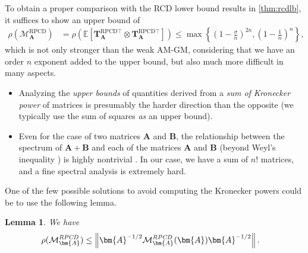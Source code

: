 \documentclass{article}
\theoremstyle{plain}
\newtheorem{lemma}[theorem]{Lemma}
\theoremstyle{definition}
\theoremstyle{remark}
\def\bignorm#1{\left\lVert#1\right\rVert}
\def\bigopen#1{\left(#1\right)}
\def\bigset#1{\left\{#1\right\}}
\newcommand{\RPCD}{\text{RPCD}} %
\newcommand{\MARPCD}{\mathcal{M}_{\bm{A}}^{\RPCD}} %
\def\mA{{\bm{A}}}
\def\mB{{\bm{B}}}
\def\mT{{\bm{T}}}
\def\gM{{\mathcal{M}}}
\newcommand{\E}{\mathbb{E}}
\begin{document}
To obtain a proper comparison with the RCD lower bound results in \cref{thm:rcdlb}, it suffices to show an upper bound of
\begin{align*}
    \rho(\MARPCD) &= \rho (\E [\mT_{\mA}^{\text{RPCD} \top} \otimes \mT_{\mA}^{\text{RPCD} \top}]) \le \max \bigset{\bigopen{1 - \frac{\sigma}{n}}^{2n}, \bigopen{1 - \frac{1}{n}}^{n}},
\end{align*}
which is not only stronger than the weak AM-GM, considering that we have an order $n$ exponent added to the upper bound, but also much more difficult in many aspects.
\begin{itemize}
    \item Analyzing the \emph{upper bounds} of quantities derived from a \emph{sum of Kronecker power} of matrices is presumably the harder direction than the opposite (we typically use the sum of squares \emph{as} an upper bound).
    \item Even for the case of two matrices $\mA$ and $\mB$, the relationship between the spectrum of $\mA + \mB$ and each of the matrices $\mA$ and $\mB$ (beyond Weyl's inequality \citep{weyl12}) is highly nontrivial \citep{knutson00}.
    In our case, we have a sum of $n!$ matrices, and a fine spectral analysis is extremely hard.
\end{itemize}

One of the few possible solutions to avoid computing the Kronecker powers could be to use the following lemma.
\begin{lemma}
    We have
    \begin{align}
        \rho(\gM_{\mA}^{\emph{\RPCD}}) &\le \bignorm{\mA^{-1/2} \gM_{\mA}^{\emph{\RPCD}} (\mA) \mA^{-1/2}}. \label{eq:normupperbound2}
    \end{align}
\end{lemma}
\end{document}

